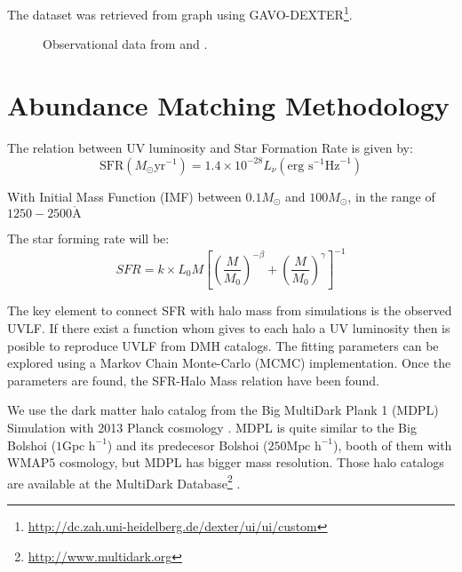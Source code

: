 \documentclass{emulateapj}
\begin{document}
The dataset was retrieved from \cite{mclure09} graph using
GAVO-DEXTER\footnote{\url{http://dc.zah.uni-heidelberg.de/dexter/ui/ui/custom}}.




\begin{figure}
\caption{Observational data from \cite{bouwens14,mclure09}and \cite{willott13}.}
\label{graph_observational_data}
\end{figure}


\section{Abundance Matching Methodology}
\label{sec:methodology}

The relation between UV luminosity and Star Formation Rate
\citep{madau98,kennicutt98} 
is given by:
\begin{equation}
 \textrm{SFR}\left(M_\odot \textrm{yr}^{-1}\right) 
      = 1.4 \times 10^{-28} L_{\nu} \left( \textrm{erg s}^{-1}\textrm{Hz}^{-1} 
	\right)
\end{equation}


  With Initial Mass Function (IMF) between $0.1 M_\odot$ 
 and $100 M_\odot$, in the range of $1250-2500 \mathring{\textrm{A}} $

The star forming rate will be:
  \begin{equation}
  SFR = k \times L_{0} M \left[ \left( \frac{M}{M_0}\right)^{-\beta} 
		   + \left( \frac{M}{M_0}\right)^{\gamma} 
               \right]^{-1}
  \end{equation}

The key element to connect SFR with halo mass from simulations is the observed UVLF. 
If there exist a function whom gives to each halo a UV luminosity then is posible to 
reproduce UVLF from DMH catalogs. The fitting parameters can be explored using a 
Markov Chain Monte-Carlo (MCMC) implementation. Once the parameters are found, 
the SFR-Halo Mass relation have been found.

We use the dark matter halo catalog from the Big MultiDark Plank 1 (MDPL) Simulation 
\citep{klypin14} with 2013 Planck cosmology \citep{planck1}. MDPL is quite similar to the 
Big Bolshoi ($1 \textrm{Gpc h}^{-1}$) \citep{prada12} and 
its predecesor Bolshoi \citep{klypin11} ($250 \textrm{Mpc h}^{-1}$), booth of them with 
WMAP5 cosmology, but MDPL has bigger mass resolution.  Those halo catalogs are 
available at the MultiDark Database\footnote{\url{http://www.multidark.org}} 
\citep{riebe13}.
\end{document}
